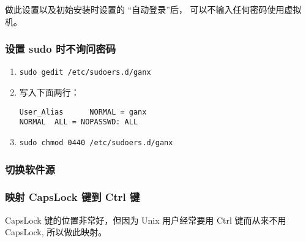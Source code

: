 \documentclass[
    11pt,
    base=hide,
    cite=authoryear,
    device=phone,
    lang=cn,
    mode=simple,
    result=answer,
    toc=onecol,
]{elegantbook_sierxue}
\begin{document}
做此设置以及初始安装时设置的 ``自动登录''后，
可以不输入任何密码使用虚拟机。

\subsubsection{设置 sudo 时不询问密码}%
\label{ssub:vm-sudo}
\begin{enumerate}
    \item \lstinline{sudo gedit /etc/sudoers.d/ganx}
    \item 写入下面两行：
\begin{lstlisting}[escapeinside=``]
User_Alias      NORMAL = ganx
NORMAL  ALL = NOPASSWD: ALL
\end{lstlisting}
    \item \lstinline{sudo chmod 0440 /etc/sudoers.d/ganx}
\end{enumerate}

\subsubsection{切换软件源}%
\label{ssub:vm-source}

\subsubsection{映射 CapsLock 键到 Ctrl 键}%
\label{ssub:vm-caps-ctrl}

CapsLock 键的位置非常好，但因为 Unix 用户经常要用 Ctrl 键而从来不用 CapsLock,
所以做此映射。
\end{document}
